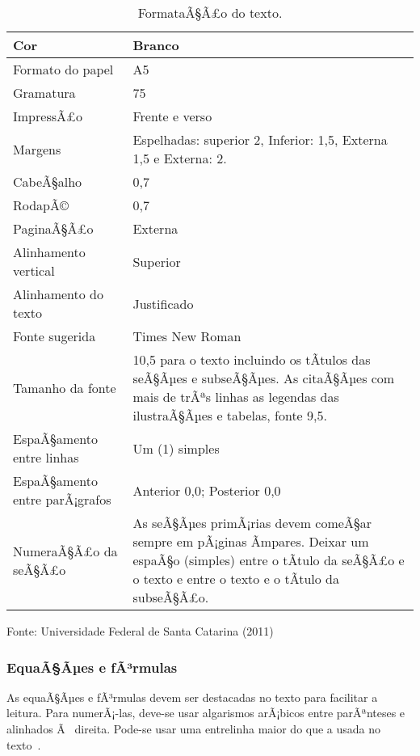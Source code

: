 \documentclass{ufscThesis} %
\begin{document}
\begin{table}[!htb]
\begin{center}
 \caption{FormataÃ§Ã£o do texto.}\label{tab:a}
  \begin{tabular}{ p{3cm} | p{6cm} }
    \hline
Cor & Branco\\ \hline
Formato do papel & A5\\ \hline
Gramatura & 75\\ \hline
ImpressÃ£o & Frente e verso\\ \hline
Margens & Espelhadas: superior 2, Inferior: 1,5, Externa 1,5 e Externa: 2.\\ \hline
CabeÃ§alho & 0,7\\ \hline
RodapÃ© & 0,7\\ \hline
PaginaÃ§Ã£o & Externa\\ \hline
Alinhamento vertical & Superior\\ \hline
Alinhamento do texto & Justificado\\ \hline
Fonte sugerida & Times New Roman \\ \hline
Tamanho da fonte & 10,5 para o texto incluindo os tÃ­tulos das seÃ§Ãµes e subseÃ§Ãµes. As citaÃ§Ãµes com mais de trÃªs linhas as legendas das ilustraÃ§Ãµes e tabelas, fonte 9,5.\\ \hline
EspaÃ§amento entre linhas & Um (1) simples\\ \hline
EspaÃ§amento entre parÃ¡grafos & Anterior 0,0; Posterior 0,0\\ \hline
NumeraÃ§Ã£o da seÃ§Ã£o & As seÃ§Ãµes  primÃ¡rias devem  comeÃ§ar  sempre em pÃ¡ginas Ã­mpares. Deixar um espaÃ§o (simples) entre o tÃ­tulo da seÃ§Ã£o e o texto e  entre o texto e o tÃ­tulo da subseÃ§Ã£o. \\  \hline
  \end{tabular}
\end{center}
Fonte: Universidade Federal de Santa Catarina (2011)
\end{table}



\subsubsection{EquaÃ§Ãµes e fÃ³rmulas}

As equaÃ§Ãµes e fÃ³rmulas devem ser destacadas no texto para facilitar a leitura.  Para numerÃ¡-las, deve-se usar algarismos arÃ¡bicos entre parÃªnteses e alinhados Ã  direita. Pode-se usar uma entrelinha maior do que a usada no texto~\cite{abnt14724}.
\end{document}
